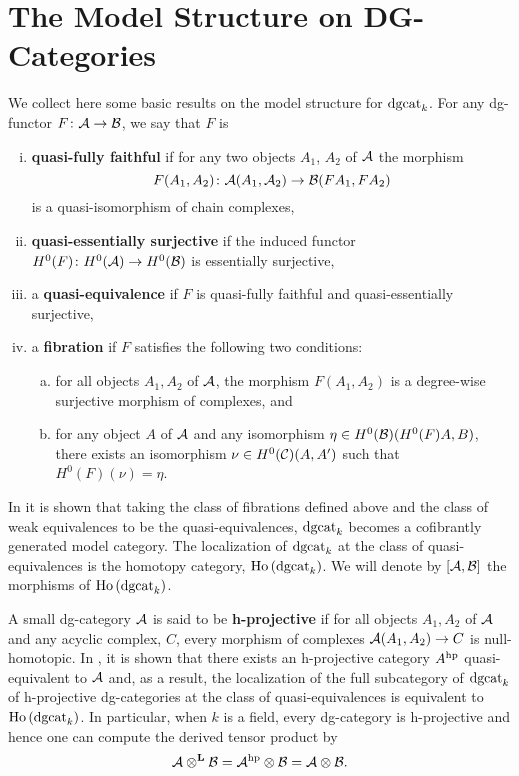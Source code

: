 \section{The Model Structure on DG-Categories}
We collect here some basic results on the model structure for \(\operatorname{dgcat}_k\).
For any dg-functor \(F \colon \mathcal{A} \to \mathcal{B}\), we say that \(F\) is
\begin{enumerate}[(i)]
\item
  \textbf{quasi-fully faithful} if for any two objects \(A_1\), \(A_2\) of \(\mathcal{A}\) the morphism
  \[F(A_1, A_2) \colon \mathcal{A}(A_1, \mathcal{A}_2) \to \mathcal{B}(FA_1, FA_2)\]
  is a quasi-isomorphism of chain complexes,
\item
  \textbf{quasi-essentially surjective} if the induced functor \(H^0(F) \colon H^0(\mathcal{A}) \to H^0(\mathcal{B})\) is essentially surjective,
\item
  a \textbf{quasi-equivalence} if \(F\) is quasi-fully faithful and quasi-essentially surjective,
\item
  a \textbf{fibration} if \(F\) satisfies the following two conditions:
  \begin{enumerate}[(a)]
  \item
    for all objects \(A_1, A_2\) of \(\mathcal{A}\), the morphism \(F(A_1,A_2)\) is a degree-wise surjective morphism of complexes, and
  \item
    for any object \(A\) of \(\mathcal{A}\) and any isomorphism \(\eta \in H^0(\mathcal{B})(H^0(F)A, B)\), there exists an isomorphism \(\nu \in H^0(\mathcal{C})(A,A^\prime)\) such that \(H^0(F)(\nu) = \eta\).
  \end{enumerate}
\end{enumerate}
In \parencite{Tabuada05} it is shown that taking the class of fibrations defined above and the class of weak equivalences to be the quasi-equivalences, \(\operatorname{dgcat}_k\) becomes a cofibrantly generated model category.
The localization of \(\operatorname{dgcat}_k\) at the class of quasi-equivalences is the homotopy category, \(\operatorname{Ho}\left(\operatorname{dgcat}_k\right)\).
We will denote by \([\mathcal{A},\mathcal{B}]\) the morphisms of \(\operatorname{Ho}\left(\operatorname{dgcat}_k\right)\).

A small dg-category \(\mathcal{A}\) is said to be \textbf{h-projective} if for all objects \(A_1, A_2\) of \(\mathcal{A}\) and any acyclic complex, \(C\), every morphism of complexes \(\mathcal{A}(A_1, A_2) \to C\) is null-homotopic.
In \parencite{CS15}, it is shown that there exists an h-projective category \(A^{\operatorname{hp}}\) quasi-equivalent to \(\mathcal{A}\) and, as a result, the localization of the full subcategory of \(\operatorname{dgcat}_k\) of h-projective dg-categories at the class of quasi-equivalences is equivalent to \(\operatorname{Ho}\left(\operatorname{dgcat}_k\right)\).
In particular, when \(k\) is a field, every dg-category is h-projective and hence one can compute the derived tensor product by
\[\mathcal{A} \otimes^\mathbf{L} \mathcal{B} = \mathcal{A}^{\operatorname{hp}} \otimes \mathcal{B} = \mathcal{A} \otimes \mathcal{B}.\]

